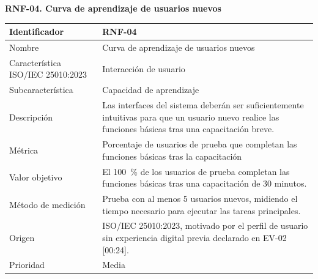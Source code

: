 \documentclass[12pt,a4paper]{article}
\begin{document}
\begin{minipage}{\linewidth}
\bigskip
\noindent\textbf{RNF-04. Curva de aprendizaje de usuarios nuevos}
\label{tab:RNF-04}

\begin{center}
\begin{tabular}{|p{4.2cm}|p{10cm}|}
\hline
Identificador & RNF-04 \\
\hline
Nombre & Curva de aprendizaje de usuarios nuevos \\
\hline
Característica ISO/IEC 25010:2023 & Interacción de usuario \\
\hline
Subcaracterística & Capacidad de aprendizaje \\
\hline
Descripción & Las interfaces del sistema deberán ser suficientemente intuitivas para que un usuario nuevo realice las funciones básicas tras una capacitación breve. \\
\hline
Métrica & Porcentaje de usuarios de prueba que completan las funciones básicas tras la capacitación \\
\hline
Valor objetivo & El 100~\% de los usuarios de prueba completan las funciones básicas tras una capacitación de 30 minutos. \\
\hline
Método de medición & Prueba con al menos 5 usuarios nuevos, midiendo el tiempo necesario para ejecutar las tareas principales. \\
\hline
Origen & ISO/IEC 25010:2023, motivado por el perfil de usuario sin experiencia digital previa declarado en EV-02 [00:24]. \\
\hline
Prioridad & Media \\
\hline
\end{tabular}
\end{center}
\end{minipage}
\end{document}
